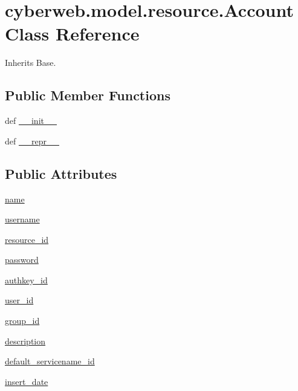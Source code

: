\hypertarget{classcyberweb_1_1model_1_1resource_1_1_account}{\section{cyberweb.\-model.\-resource.\-Account \-Class \-Reference}
\label{classcyberweb_1_1model_1_1resource_1_1_account}
}


\-Inherits \-Base.

\subsection*{\-Public \-Member \-Functions}
\begin{DoxyCompactItemize}
\item 
def \hyperlink{classcyberweb_1_1model_1_1resource_1_1_account_aa23eeb168d6aa26ee765e432310393c0}{\-\_\-\-\_\-init\-\_\-\-\_\-}
\item 
def \hyperlink{classcyberweb_1_1model_1_1resource_1_1_account_ab4f48bf92370ba7e9286c5f5f3e0ff13}{\-\_\-\-\_\-repr\-\_\-\-\_\-}
\end{DoxyCompactItemize}
\subsection*{\-Public \-Attributes}
\begin{DoxyCompactItemize}
\item 
\hyperlink{classcyberweb_1_1model_1_1resource_1_1_account_a600a79a9f88e74342f6e18fe2be520d7}{name}
\item 
\hyperlink{classcyberweb_1_1model_1_1resource_1_1_account_a8f10b183c798f9a43cf6df308a8f031c}{username}
\item 
\hyperlink{classcyberweb_1_1model_1_1resource_1_1_account_ac5f8a9d453d073fbf7f83d744ae999e5}{resource\-\_\-id}
\item 
\hyperlink{classcyberweb_1_1model_1_1resource_1_1_account_a46641916c4e6acbde50422f83507365d}{password}
\item 
\hyperlink{classcyberweb_1_1model_1_1resource_1_1_account_aacbb0717d12bfb933d6e73a6b0b9d386}{authkey\-\_\-id}
\item 
\hyperlink{classcyberweb_1_1model_1_1resource_1_1_account_a5abec7dcb8106460b78cd227f858ca5c}{user\-\_\-id}
\item 
\hyperlink{classcyberweb_1_1model_1_1resource_1_1_account_ad42626a74ad003fc3da8715ad0308637}{group\-\_\-id}
\item 
\hyperlink{classcyberweb_1_1model_1_1resource_1_1_account_a1c831f17658b1cffa627f418e019a6b1}{description}
\item 
\hyperlink{classcyberweb_1_1model_1_1resource_1_1_account_a3e98ae15231300ff8594374b206f4d25}{default\-\_\-servicename\-\_\-id}
\item 
\hyperlink{classcyberweb_1_1model_1_1resource_1_1_account_a8763979d8c524b72af9b2453eedcb636}{insert\-\_\-date}
\end{DoxyCompactItemize}
